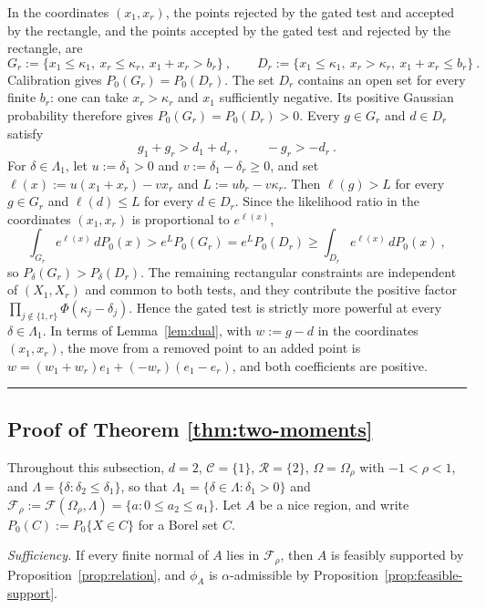 \documentclass[11pt]{article}
\newcommand{\red}[1]{{\color{red}#1}} %
\numberwithin{equation}{section}
\def\qed{\rule{2mm}{2mm}}
\theoremstyle{definition}
\begin{document}
In the coordinates $(x_1,x_r)$, the points rejected by the gated test and accepted by the rectangle, and the points accepted by the gated test and rejected by the rectangle, are
\[
G_r:=\{x_1\le\kappa_1,\ x_r\le\kappa_r,\ x_1+x_r>b_r\}~,
\qquad
D_r:=\{x_1\le\kappa_1,\ x_r>\kappa_r,\ x_1+x_r\le b_r\}~.
\]
Calibration gives $P_0(G_r)=P_0(D_r)$. \red{The set $D_r$ contains an open set for every finite $b_r$: one can take $x_r>\kappa_r$ and $x_1$ sufficiently negative. Its positive Gaussian probability therefore gives $P_0(G_r)=P_0(D_r)>0$.} Every $g\in G_r$ and $d\in D_r$ satisfy
\[
g_1+g_r>d_1+d_r~,
\qquad
-g_r>-d_r~.
\]
For $\delta\in\Lambda_1$, let $u:=\delta_1>0$ and $v:=\delta_1-\delta_r\ge0$, and set $\ell(x):=u(x_1+x_r)-vx_r$ and $L:=ub_r-v\kappa_r$. Then $\ell(g)>L$ for every $g\in G_r$ and $\ell(d)\le L$ for every $d\in D_r$. Since the likelihood ratio in the coordinates $(x_1,x_r)$ is proportional to $e^{\ell(x)}$,
\[
\int_{G_r}e^{\ell(x)}\,dP_0(x)>e^{L}P_0(G_r)=e^{L}P_0(D_r)\ge\int_{D_r}e^{\ell(x)}\,dP_0(x)~,
\]
so $P_\delta(G_r)>P_\delta(D_r)$. The remaining rectangular constraints are independent of $(X_1,X_r)$ and common to both tests, and they contribute the positive factor $\prod_{j\notin\{1,r\}}\Phi(\kappa_j-\delta_j)$. Hence the gated test is strictly more powerful at every $\delta\in\Lambda_1$. In terms of Lemma~\ref{lem:dual}, with $w:=g-d$ in the coordinates $(x_1,x_r)$, the move from a removed point to an added point is $w=(w_1+w_r)e_1+(-w_r)(e_1-e_r)$, and both coefficients are positive. \qed

\subsection{Proof of Theorem \ref{thm:two-moments}}\label{app:proof-two-moments}


Throughout this subsection, $d=2$, $\mathcal C=\{1\}$, $\mathcal R=\{2\}$, $\Omega=\Omega_\rho$ with $-1<\rho<1$, and $\Lambda=\{\delta:\delta_2\le\delta_1\}$, so that $\Lambda_1=\{\delta\in\Lambda:\delta_1>0\}$ and $\mathcal F_\rho:=\mathcal F(\Omega_\rho,\Lambda)=\{a:0\le a_2\le a_1\}$. Let $A$ be a nice region, and write $P_0(C):=P_0\{X\in C\}$ for a Borel set $C$.

\emph{Sufficiency.} If every finite normal of $A$ lies in $\mathcal F_\rho$, then $A$ is feasibly supported by Proposition~\ref{prop:relation}, and $\phi_A$ is $\alpha$-admissible by Proposition~\ref{prop:feasible-support}.
\end{document}
